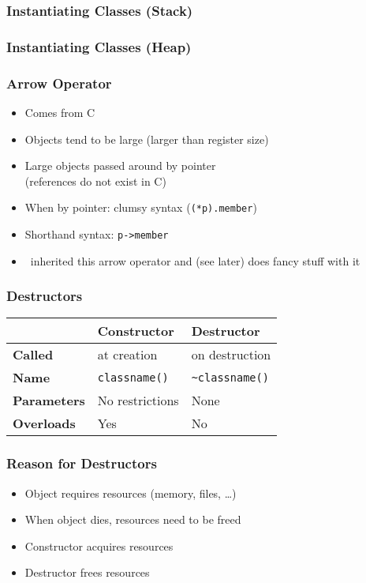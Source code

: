 \begin{frame}
  \frametitle{Instantiating Classes (Stack)}
\end{frame}

\begin{frame}
  \frametitle{Instantiating Classes (Heap)}
  \begin{overprint}
  \end{overprint}
\end{frame}

\begin{frame}
  \frametitle{Arrow Operator}
  \begin{itemize}
    \item Comes from C
    \item Objects tend to be large (larger than register size)
    \item Large objects passed around by pointer \\ (references do not exist in C)
    \item When by pointer: clumsy syntax ({\tt (*p).member})
    \item Shorthand syntax: {\tt p->member}
    \item \cpp\ inherited this arrow operator and (see later) does fancy stuff with it
  \end{itemize}
\end{frame}

\begin{frame}
  \frametitle{Destructors}
  \begin{center}
    \begin{tabular}{lll}
      & \textbf{Constructor} & \textbf{Destructor} \\
      \toprule
      \textbf{Called} & at creation & on destruction \\
      \textbf{Name} & {\tt classname()} & {\tt \~{}classname()} \\
      \textbf{Parameters} & No restrictions & None \\
      \textbf{Overloads} & Yes & No \\
    \end{tabular}
  \end{center}
  \vskip5mm
\end{frame}

\begin{frame}
  \frametitle{Reason for Destructors}
  \begin{itemize}
    \item Object requires resources (memory, files, \dots)
    \item When object dies, resources need to be freed
    \item Constructor acquires resources
    \item Destructor frees resources
  \end{itemize}
\end{frame}


